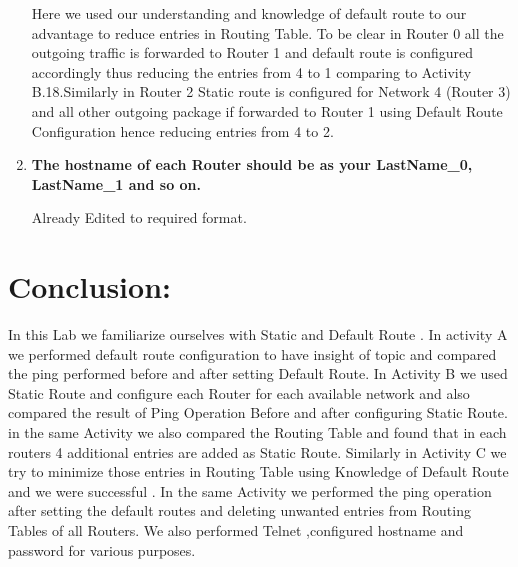 \documentclass[a4paper,11pt]{article}
\begin{document}
\begin{enumerate}
          Here we used our understanding and knowledge of default route to our advantage to reduce entries in Routing Table. To be clear  in Router 0 all the outgoing traffic is forwarded to Router 1 and default route is configured accordingly thus reducing the entries from 4 to 1 comparing to Activity B.18.Similarly  in Router 2 Static route is configured for Network 4 (Router 3) and all other outgoing package if forwarded to Router 1 using Default Route Configuration hence reducing entries from 4 to 2.


    \item\textbf{  The hostname of each Router should be as your LastName\_0, LastName\_1 and so on.}

          Already Edited to required format.


\end{enumerate}


\section{Conclusion:}

In this Lab we familiarize ourselves with Static and Default Route .
In activity A we performed default  route configuration to have insight of topic and compared the ping performed before and after setting Default Route. In Activity B we used Static Route and configure each Router for each available network and also compared the result of Ping Operation Before and after configuring Static Route. in the same Activity we also compared the Routing Table and found that in each routers 4 additional  entries are added as Static Route. Similarly in Activity C we try to minimize those entries in Routing Table using Knowledge of Default Route and we were successful . In the same Activity we performed the ping operation after setting the default routes and deleting unwanted entries from Routing Tables of all Routers. We also performed Telnet ,configured hostname and password for various purposes.
\end{document}
